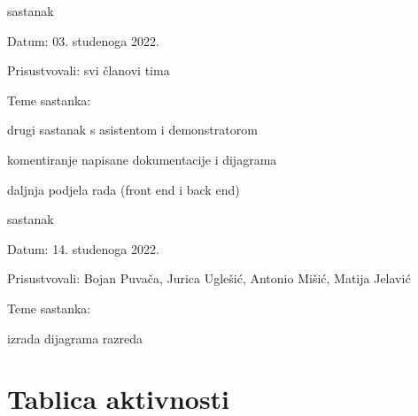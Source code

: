 \begin{packed_enum}
                \item  sastanak
			\item[] \begin{packed_item}
				\item Datum: 03. studenoga 2022.
				\item Prisustvovali: svi članovi tima
				\item Teme sastanka:
				\begin{packed_item}
					\item  drugi sastanak s asistentom i demonstratorom
					\item  komentiranje napisane dokumentacije i dijagrama
                        \item  daljnja podjela rada (front end i back end)
				\end{packed_item}
			\end{packed_item}

                \item  sastanak
			\item[] \begin{packed_item}
				\item Datum: 14. studenoga 2022.
				\item Prisustvovali: Bojan Puvača, Jurica Uglešić, Antonio Mišić, Matija Jelavić
				\item Teme sastanka:
				\begin{packed_item}
					\item  izrada dijagrama razreda
                        
				\end{packed_item}
			\end{packed_item}
			
			
		\end{packed_enum}
		
		\eject
		\section*{Tablica aktivnosti}

